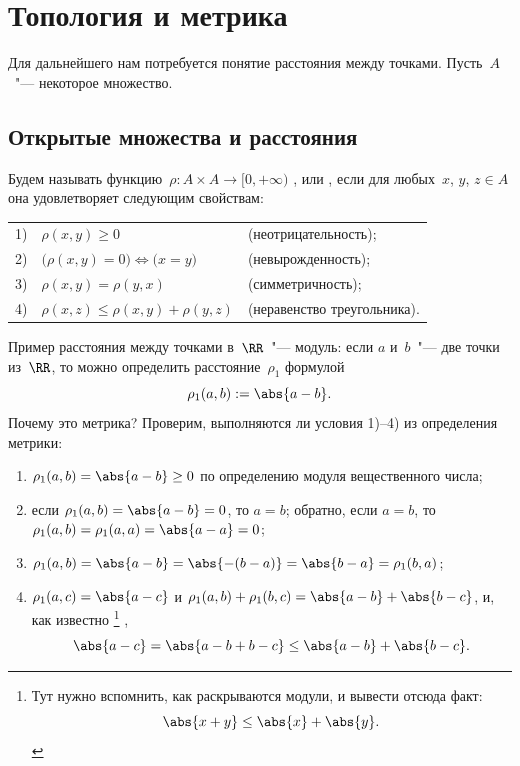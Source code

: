 
\section{Топология и метрика}

Для дальнейшего нам потребуется понятие расстояния между точками. Пусть~$A$~"--- некоторое множество.

\subsection{Открытые множества и расстояния}

\begin{definition}
	Будем называть функцию~$\rho \colon A \times A \to [0, +\infty)$
	, или , если для любых~$x$, $y$, $z \in A$
	она удовлетворяет следующим свойствам:%
	\par
	\addvspace{\medskipamount}%
	\begin{tabular}{rl@{\qquad}l}
		1) & $\rho(x, y) \geq 0$ & (неотрицательность);
		\\[\smallskipamount]
		2) & $\bigl( \rho(x, y) = 0 \bigr) \iff \bigl( x = y \bigr)$ &
			 (невырожденность);
		\\[\smallskipamount]
		3) & $\rho(x, y) = \rho(y, x)$ & (симметричность);
		\\[\smallskipamount]
		4) & $\rho(x, z) \leq \rho(x, y) + \rho(y, z)$ & (неравенство треугольника).
	\end{tabular}
\end{definition}

\begin{example}
	Пример расстояния между точками в~$\RR$~"--- модуль: если $a$ и~$b$~"--- две
	точки из~$\RR$, то можно определить расстояние~$\rho_1$ формулой
	\[
		\rho_1(a, b) := \abs{a - b}.
	\]
	Почему это метрика? Проверим, выполняются ли условия 1)--4) из определения
	метрики:
	\begin{enumerate}[1)]
		\item $\rho_1(a, b) = \abs{a - b} \geq 0$ по определению модуля
			вещественного числа;
		\item если $\rho_1(a, b) = \abs{a - b} = 0$, то $a = b$; обратно, если $a =
			b$, то $\rho_1(a, b) = \rho_1(a, a) = \abs{a - a} = 0$;
		\item $\rho_1(a, b) = \abs{a - b} = \abs{-(b - a)} = \abs{b - a} =
			\rho_1(b, a)$;
		\item $\rho_1(a, c) = \abs{a - c}$ и $\rho_1(a, b) + \rho_1(b, c) = \abs{a
			- b} + \abs{b - c}$, и, как известно%
			\footnote{%
				Тут нужно вспомнить, как раскрываются модули, и вывести отсюда факт:
				\[
					\abs{x + y} \leq \abs{x} + \abs{y}
					.
				\]
			}%
			,
			\[
				\abs{a - c} =
				\abs{a - b + b - c} \leq
				\abs{a - b} + \abs{b - c}
				.
			\]
	\end{enumerate}
\end{example}

